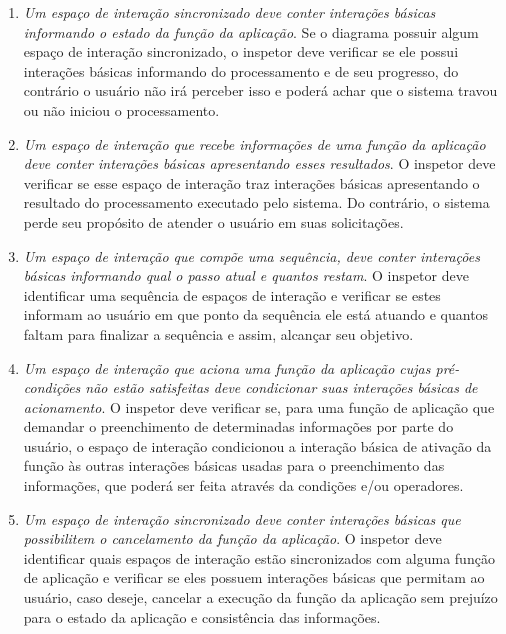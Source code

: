 \begin{enumerate}
  \renewcommand{\labelenumi}{$D_{\arabic{enumi}}$}


  \item  {\em   Um  espaço  de  interação   sincronizado  deve  conter
    interações básicas  informando o  estado da função  da aplicação}.
    Se o  diagrama possuir algum  espaço de interação  sincronizado, o
    inspetor   deve  verificar  se   ele  possui   interações  básicas
    informando  do processamento e  de seu  progresso, do  contrário o
    usuário não irá perceber isso  e poderá achar que o sistema travou
    ou não iniciou o processamento.

  \item  {\em Um  espaço de  interação que  recebe informações  de uma
    função  da aplicação deve  conter interações  básicas apresentando
    esses resultados}.   O inspetor deve  verificar se esse  espaço de
    interação  traz  interações básicas  apresentando  o resultado  do
    processamento  executado pelo  sistema.  Do  contrário,  o sistema
    perde seu propósito de atender o usuário em suas solicitações.

  \item {\em  Um espaço  de interação que  compõe uma  sequência, deve
    conter interações básicas informando  qual o passo atual e quantos
    restam}. O  inspetor deve identificar uma sequência  de espaços de
    interação e verificar se estes informam ao usuário em que ponto da
    sequência  ele está  atuando  e quantos  faltam  para finalizar  a
    sequência e assim, alcançar seu objetivo.

  \item {\em Um espaço de interação que aciona uma função da aplicação
    cujas  pré-condições não estão  satisfeitas deve  condicionar suas
    interações básicas de acionamento}.  O inspetor deve verificar se,
    para  uma função  de  aplicação que  demandar  o preenchimento  de
    determinadas  informações  por  parte  do  usuário,  o  espaço  de
    interação condicionou a interação  básica de ativação da função às
    outras  interações   básicas  usadas  para   o  preenchimento  das
    informações,  que  poderá  ser  feita através  da  condições  e/ou
    operadores.
     

  \item  {\em   Um  espaço  de  interação   sincronizado  deve  conter
    interações básicas  que possibilitem  o cancelamento da  função da
    aplicação}. O inspetor deve identificar quais espaços de interação
    estão sincronizados com alguma  função de aplicação e verificar se
    eles  possuem interações  básicas  que permitam  ao usuário,  caso
    deseje, cancelar  a execução da  função da aplicação  sem prejuízo
    para o estado da aplicação e consistência das informações.


\end{enumerate}
